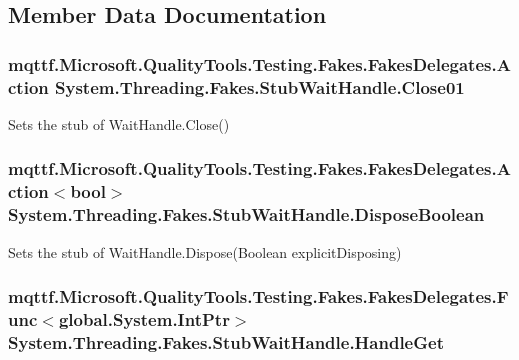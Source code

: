 \subsection{Member Data Documentation}
\hypertarget{class_system_1_1_threading_1_1_fakes_1_1_stub_wait_handle_a18bcaa7d4f4caafa665e8c826b5d0888}{
\subsubsection[{Close01}]{\setlength{\rightskip}{0pt plus 5cm}mqttf.\-Microsoft.\-Quality\-Tools.\-Testing.\-Fakes.\-Fakes\-Delegates.\-Action System.\-Threading.\-Fakes.\-Stub\-Wait\-Handle.\-Close01}}\label{class_system_1_1_threading_1_1_fakes_1_1_stub_wait_handle_a18bcaa7d4f4caafa665e8c826b5d0888}


Sets the stub of Wait\-Handle.\-Close()

\hypertarget{class_system_1_1_threading_1_1_fakes_1_1_stub_wait_handle_afaf6e39b7f29bdc5ab3cd87647a78438}{
\subsubsection[{Dispose\-Boolean}]{\setlength{\rightskip}{0pt plus 5cm}mqttf.\-Microsoft.\-Quality\-Tools.\-Testing.\-Fakes.\-Fakes\-Delegates.\-Action$<$bool$>$ System.\-Threading.\-Fakes.\-Stub\-Wait\-Handle.\-Dispose\-Boolean}}\label{class_system_1_1_threading_1_1_fakes_1_1_stub_wait_handle_afaf6e39b7f29bdc5ab3cd87647a78438}


Sets the stub of Wait\-Handle.\-Dispose(\-Boolean explicit\-Disposing)

\hypertarget{class_system_1_1_threading_1_1_fakes_1_1_stub_wait_handle_aa751c5d97788b4613df9b3fa263da488}{
\subsubsection[{Handle\-Get}]{\setlength{\rightskip}{0pt plus 5cm}mqttf.\-Microsoft.\-Quality\-Tools.\-Testing.\-Fakes.\-Fakes\-Delegates.\-Func$<$global.\-System.\-Int\-Ptr$>$ System.\-Threading.\-Fakes.\-Stub\-Wait\-Handle.\-Handle\-Get}}\label{class_system_1_1_threading_1_1_fakes_1_1_stub_wait_handle_aa751c5d97788b4613df9b3fa263da488}


